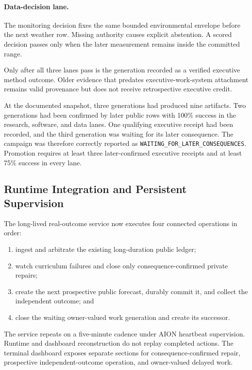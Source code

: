 \paragraph{Data-decision lane.}
The monitoring decision fixes the same bounded environmental envelope before
the next weather row.  Missing authority causes explicit abstention.  A scored
decision passes only when the later measurement remains inside the committed
range.

Only after all three lanes pass is the generation recorded as a verified
executive method outcome.  Older evidence that predates executive-work-system
attachment remains valid provenance but does not receive retrospective
executive credit.

At the documented snapshot, three generations had produced nine artifacts.
Two generations had been confirmed by later public rows with 100\% success in
the research, software, and data lanes.  One qualifying executive receipt had
been recorded, and the third generation was waiting for its later consequence.
The campaign was therefore correctly reported as
\texttt{WAITING\_FOR\_LATER\_CONSEQUENCES}.  Promotion requires at least three
later-confirmed executive receipts and at least 75\% success in every lane.

\subsection{Runtime Integration and Persistent Supervision}
\label{subsec:aion-delayed-runtime-integration}

The long-lived real-outcome service now executes four connected operations in
order:
\begin{enumerate}
    \item ingest and arbitrate the existing long-duration public ledger;
    \item watch curriculum failures and close only consequence-confirmed
          private repairs;
    \item create the next prospective public forecast, durably commit it, and
          collect the independent outcome; and
    \item close the waiting owner-valued work generation and create its
          successor.
\end{enumerate}
The service repeats on a five-minute cadence under AION heartbeat supervision.
Runtime and dashboard reconstruction do not replay completed actions.  The
terminal dashboard exposes separate sections for consequence-confirmed repair,
prospective independent-outcome operation, and owner-valued delayed work.


